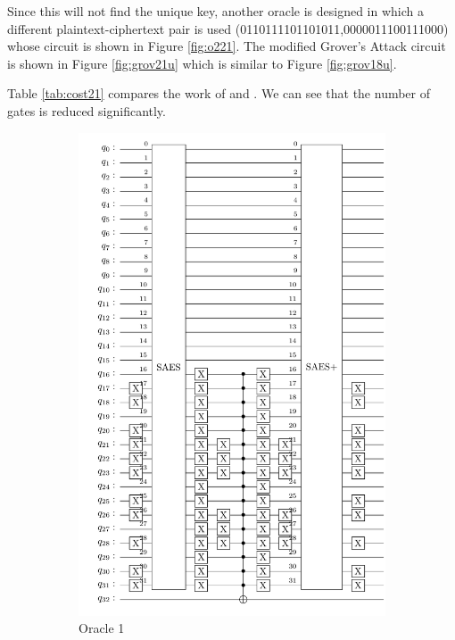 \documentclass[preprint]{transcrypto}
\begin{document}
Since this will not find the unique key, another oracle is designed in which a different plaintext-ciphertext pair is used (0110111101101011,0000011100111000) whose circuit is shown in Figure \ref{fig:o221}. The modified Grover's Attack circuit is shown in Figure \ref{fig:grov21u} which is similar to Figure \ref{fig:grov18u}.

Table \ref{tab:cost21} compares the work of \cite{Almazrooie} and \cite{Jang}. We can see that the number of gates is reduced significantly.

\begin{figure}[h!]
\centering
\begin{subfigure}{.5\textwidth}
  \centering
  \includegraphics[width=0.8\linewidth]{saes21/Uf1.pdf}
  \caption{Oracle 1}
  \label{fig:o121}
\end{subfigure}%
\begin{subfigure}{.5\textwidth}
  \centering

\end{subfigure}
\end{figure}
\end{document}
